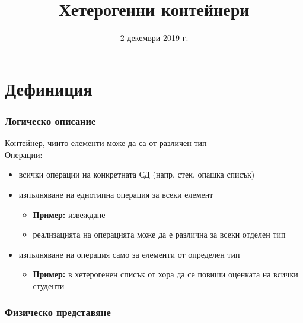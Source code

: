 \documentclass[alsotrans]{beamerswitch}
\title{Хетерогенни контейнери}
\date{2 декември 2019 г.}
\begin{document}
\begin{frame}
  \titlepage
\end{frame}

\section{Дефиниция}

\begin{frame}
  \frametitle{Логическо описание}
  Контейнер, чиито елементи може да са от различен тип\\[2ex]
  Операции:
  \begin{itemize}
  \item всички операции на конкретната СД (напр. стек, опашка списък)
  \item изпълняване на еднотипна операция за всеки елемент
    \begin{itemize}
    \item \textbf{Пример:} извеждане
    \item реализацията на операцията може да е различна за всеки отделен тип
    \end{itemize}
  \item изпълняване на операция само за елементи от определен тип
    \begin{itemize}
    \item \textbf{Пример:} в хетерогенен списък от хора да се повиши оценката на всички студенти
    \end{itemize}
  \end{itemize}
\end{frame}

\begin{frame}
  \frametitle{Физическо представяне}
  \begin{center}
    \scriptsize
  \end{center}
\end{frame}
\end{document}
